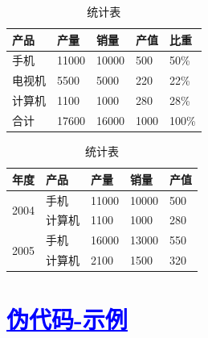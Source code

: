 \begin{table}[htbp]
  \linespread{1.5}
  \songti
  \centering
  \caption{统计表}\label{统计表}
  \begin{tabular}{|l|l|l|l|l|}
  \hline
  产品  & 产量    & 销量    & 产值   & 比重    \\ \hline
  手机  & 11000 & 10000 & 500  & 50\%  \\ \hline
  电视机 & 5500  & 5000  & 220  & 22\%  \\ \hline
  计算机 & 1100  & 1000  & 280  & 28\%  \\ \hline
  合计  & 17600 & 16000 & 1000 & 100\% \\ \hline
  \end{tabular}
\end{table}

\begin{table}[htbp]
  \linespread{1.5}
  \songti
  \centering
  \caption{统计表}\label{统计表}
  \begin{tabular}{|l|l|l|l|l|}
  \hline
  年度                    & 产品  & 产量    & 销量    & 产值  \\ \hline
  \multirow{2}{*}{2004} & 手机  & 11000 & 10000 & 500 \\ \cline{2-5} 
                      & 计算机 & 1100  & 1000  & 280 \\ \hline
  \multirow{2}{*}{2005} & 手机  & 16000 & 13000 & 550 \\ \cline{2-5} 
                      & 计算机 & 2100  & 1500  & 320 \\ \hline
  \end{tabular}
\end{table}


\section{\textcolor{blue}{\underline{\underline{伪代码-示例}}}}


